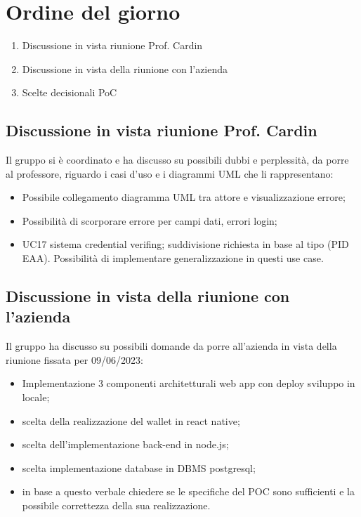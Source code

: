\section{Ordine del giorno}
\begin{enumerate}
\item Discussione in vista riunione Prof. Cardin
\item Discussione in vista della riunione con l'azienda 
\item Scelte decisionali PoC
\end{enumerate}

\subsection{Discussione in vista riunione Prof. Cardin}
Il gruppo si è coordinato e ha discusso su possibili dubbi e perplessità, da porre al professore, riguardo i casi d'uso e i diagrammi UML che li rappresentano:
\begin{itemize}
    \item Possibile collegamento diagramma UML tra attore e visualizzazione errore;
    \item Possibilità di scorporare errore per campi dati, errori login;
    \item UC17 sistema credential verifing; suddivisione richiesta in base al tipo (PID EAA). Possibilità di implementare generalizzazione in questi use case.
\end{itemize}

\subsection{Discussione in vista della riunione con l'azienda}
Il gruppo ha discusso su possibili domande da porre all'azienda in vista della riunione fissata per 09/06/2023:
\begin{itemize}
\item Implementazione 3 componenti architetturali web app con deploy sviluppo in locale;
\item scelta della realizzazione del wallet in react native;
\item scelta dell'implementazione back-end in node.js;
\item scelta implementazione database in DBMS postgresql;
\item in base a questo verbale chiedere se le specifiche del POC sono sufficienti e la possibile correttezza della sua realizzazione.
\end{itemize}
